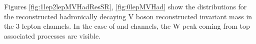 
Figures \ref{fig:1lep2lepMVHadResSR}, \ref{fig:0lepMVHad} show the distributions 
for the reconstructed hadronically decaying V boson reconstructed invariant mass in the 3 lepton channels. 
In the case of \zlep and \olep channels, the W peak coming from top associated processes are visible.

